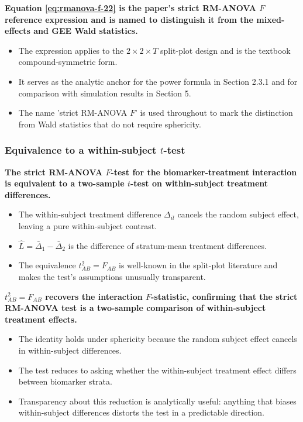 \documentclass[
  11pt,
]{article}
\begin{document}
\textbf{Equation \ref{eq:rmanova-f-22} is the paper's strict RM-ANOVA $F$ reference expression and is named to distinguish it from the mixed-effects and GEE Wald statistics.}

\begin{itemize}\setlength{\itemsep}{2pt}\setlength{\parskip}{0pt}
\item The expression applies to the $2 \times 2 \times T$ split-plot design and is the textbook compound-symmetric form.
\item It serves as the analytic anchor for the power formula in Section 2.3.1 and for comparison with simulation results in Section 5.
\item The name 'strict RM-ANOVA $F$' is used throughout to mark the distinction from Wald statistics that do not require sphericity.
\end{itemize}

\subsubsection{\texorpdfstring{Equivalence to a within-subject \(t\)-test}{Equivalence to a within-subject t-test}}\label{equivalence-to-a-within-subject-t-test}

\textbf{The strict RM-ANOVA $F$-test for the biomarker-treatment interaction is equivalent to a two-sample $t$-test on within-subject treatment differences.}

\begin{itemize}\setlength{\itemsep}{2pt}\setlength{\parskip}{0pt}
\item The within-subject treatment difference $\Delta_{il}$ cancels the random subject effect, leaving a pure within-subject contrast.
\item $\hat{L} = \bar{\Delta}_1 - \bar{\Delta}_2$ is the difference of stratum-mean treatment differences.
\item The equivalence $t_{AB}^2 = F_{AB}$ is well-known in the split-plot literature and makes the test's assumptions unusually transparent.
\end{itemize}

\textbf{$t_{AB}^2 = F_{AB}$ recovers the interaction $F$-statistic, confirming that the strict RM-ANOVA test is a two-sample comparison of within-subject treatment effects.}

\begin{itemize}\setlength{\itemsep}{2pt}\setlength{\parskip}{0pt}
\item The identity holds under sphericity because the random subject effect cancels in within-subject differences.
\item The test reduces to asking whether the within-subject treatment effect differs between biomarker strata.
\item Transparency about this reduction is analytically useful: anything that biases within-subject differences distorts the test in a predictable direction.
\end{itemize}
\end{document}
